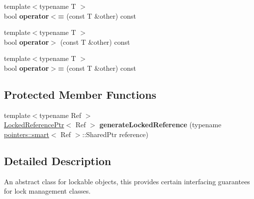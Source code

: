 \begin{DoxyCompactItemize}
\item 
\hypertarget{classcore_1_1threading_1_1_lockable_a3643d77959d3e49e0cf45c1161ad9e51}{{\footnotesize template$<$typename T $>$ }\\bool {\bfseries operator$<$=} (const T \&other) const }\label{classcore_1_1threading_1_1_lockable_a3643d77959d3e49e0cf45c1161ad9e51}

\item 
\hypertarget{classcore_1_1threading_1_1_lockable_aa13cc2103cede7fcd671b9b702128948}{{\footnotesize template$<$typename T $>$ }\\bool {\bfseries operator$>$} (const T \&other) const }\label{classcore_1_1threading_1_1_lockable_aa13cc2103cede7fcd671b9b702128948}

\item 
\hypertarget{classcore_1_1threading_1_1_lockable_a5941b90a5f3ea21ee315ffe006024435}{{\footnotesize template$<$typename T $>$ }\\bool {\bfseries operator$>$=} (const T \&other) const }\label{classcore_1_1threading_1_1_lockable_a5941b90a5f3ea21ee315ffe006024435}

\end{DoxyCompactItemize}
\subsection*{Protected Member Functions}
\begin{DoxyCompactItemize}
\item 
\hypertarget{classcore_1_1threading_1_1_lockable_ab1dd110ed8b173cb8748507e096d6e3a}{{\footnotesize template$<$typename Ref $>$ }\\\hyperlink{classcore_1_1threading_1_1_locked_reference_ptr}{Locked\-Reference\-Ptr}$<$ Ref $>$ {\bfseries generate\-Locked\-Reference} (typename \hyperlink{structcore_1_1pointers_1_1smart}{pointers\-::smart}$<$ Ref $>$\-::Shared\-Ptr reference)}\label{classcore_1_1threading_1_1_lockable_ab1dd110ed8b173cb8748507e096d6e3a}

\end{DoxyCompactItemize}


\subsection{Detailed Description}
An abstract class for lockable objects, this provides certain interfacing guarantees for lock management classes. 

